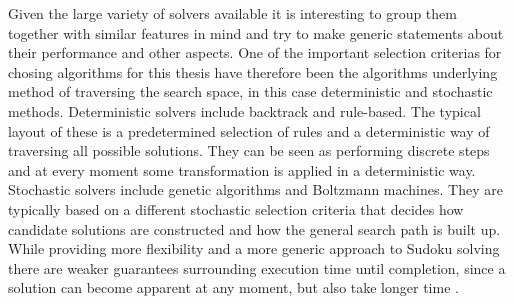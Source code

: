 \documentclass[a4paper,11pt]{kth-mag}
\begin{document}
Given the large variety of solvers available it is interesting to group them together with similar features in mind and try to make generic statements about their performance and other aspects.
One of the important selection criterias for chosing algorithms for this thesis have therefore been the algorithms underlying method of traversing the search space, in this case deterministic and stochastic methods.
Deterministic solvers include backtrack and rule-based.
The typical layout of these is a predetermined selection of rules and a deterministic way of traversing all possible solutions.
They can be seen as performing discrete steps and at every moment some transformation is applied in a deterministic way.
Stochastic solvers include genetic algorithms and Boltzmann machines.
They are typically based on a different stochastic selection criteria that decides how candidate solutions are constructed and how the general search path is built up.
While providing more flexibility and a more generic approach to Sudoku solving there are weaker guarantees surrounding execution time until completion, since a solution can become apparent at any moment, but also take longer time \cite{stochastic}.

\FloatBarrier
\end{document}
